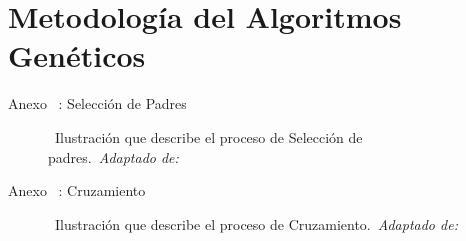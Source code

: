 \section[Metodología AG]{Metodología del Algoritmos Genéticos}

\begin{frame}{Anexo \thesection~: Selección de Padres}%
    \vspace{-0.15cm}
    \begin{figure}[H]
        \centering
        \vspace{-0.25cm}
        \caption{\tiny~Ilustración que describe el proceso de Selección de padres.~\textit{Adaptado de:}~\cite{ayoub2020}}%
        \label{fig:tournament_selection}
    \end{figure}
\end{frame}

\begin{frame}{Anexo \thesection~: Cruzamiento}%
    \vspace{-0.15cm}
    \begin{figure}[H]
        \centering
        \vspace{-0.25cm}
        \caption{\tiny~Ilustración que describe el proceso de Cruzamiento.~\textit{Adaptado de:}~\cite{stackoverflow_crossover_index_2019}}%
        \label{fig:tournament_selection}
    \end{figure}
\end{frame}

